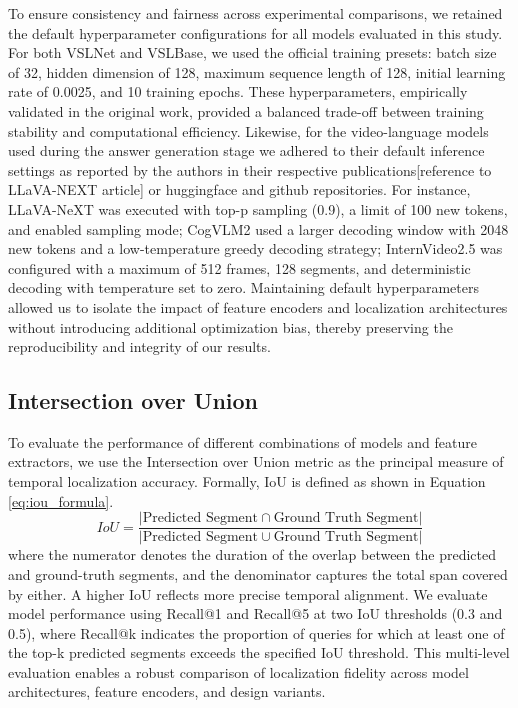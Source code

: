 \documentclass[10pt,twocolumn,letterpaper]{article}
\begin{document}
To ensure consistency and fairness across experimental comparisons, we retained the default hyperparameter configurations for all models evaluated in this study. For both VSLNet and VSLBase, we used the official training presets: batch size of 32, hidden dimension of 128, maximum sequence length of 128, initial learning rate of 0.0025, and 10 training epochs. These hyperparameters, empirically validated in the original work, provided a balanced trade-off between training stability and computational efficiency. Likewise, for the video-language models used during the answer generation stage we adhered to their default inference settings as reported by the authors in their respective publications[reference to LLaVA-NEXT article] or huggingface and github repositories.
For instance, LLaVA-NeXT was executed with top-p sampling (0.9), a limit of 100 new tokens, and enabled sampling mode; CogVLM2 used a larger decoding window with 2048 new tokens and a low-temperature greedy decoding strategy; InternVideo2.5 was configured with a maximum of 512 frames, 128 segments, and deterministic decoding with temperature set to zero. Maintaining default hyperparameters allowed us to isolate the impact of feature encoders and localization architectures without introducing additional optimization bias, thereby preserving the reproducibility and integrity of our results.


	
	
\subsection{Intersection over Union}
	
To evaluate the performance of different combinations of models and feature extractors, we use the Intersection over Union metric as the principal measure of temporal localization accuracy. Formally, IoU is defined as shown in Equation \eqref{eq:iou_formula}.		
	\begin{equation}
		IoU = \frac{| \text{Predicted Segment} \cap \text{Ground Truth Segment} |}{| \text{Predicted Segment} \cup \text{Ground Truth Segment} |}
		\label{eq:iou_formula} %
	\end{equation}		 
where the numerator denotes the duration of the overlap between the predicted and ground-truth segments, and the denominator captures the total span covered by either. A higher IoU reflects more precise temporal alignment. We evaluate model performance using Recall@1 and Recall@5 at two IoU thresholds (0.3 and 0.5), where Recall@k indicates the proportion of queries for which at least one of the top-k predicted segments exceeds the specified IoU threshold. This multi-level evaluation enables a robust comparison of localization fidelity across model architectures, feature encoders, and design variants.
	
\end{document}
